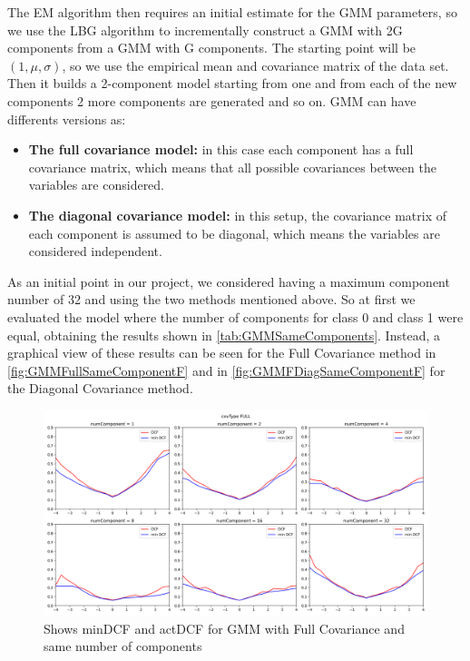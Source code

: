 The EM algorithm then requires an initial estimate for the GMM parameters, so we use the LBG algorithm to incrementally construct a
GMM with 2G components from a GMM with G components.
The starting point will be \( (1,\mu,\sigma)\), so we use the empirical mean and covariance matrix of the data set.
Then it builds a 2-component model starting from one and from each of the new components 2 more components are generated and so on.
GMM can have differents versions as:
\begin{itemize}
    \item \textbf{The full covariance model:} in this case each component has a full covariance matrix, which means that all possible covariances between the variables are considered.
    \item \textbf{The diagonal covariance model:} in this setup, the covariance matrix of each component is assumed to be diagonal, which means the variables are considered independent.
\end{itemize}

As an initial point in our project, we considered having a maximum component number of 32 and using the two methods mentioned above.
So at first we evaluated the model where the number of components for class 0 and class 1 were equal, obtaining the results shown in
\autoref{tab:GMMSameComponents}.
Instead, a graphical view of these results can be seen for the Full Covariance method in \autoref{fig:GMMFullSameComponentF} and
in \autoref{fig:GMMFDiagSameComponentF} for the Diagonal Covariance method.

\begin{figure}[h!]
    \centering
    \includegraphics[width=\linewidth]{Lab/10. Lab 10/Images/01. covTypeFullSameComponent}
    \caption{Shows minDCF and actDCF for GMM with Full Covariance and same number of components}
    \label{fig:GMMFullSameComponentF}
\end{figure}

